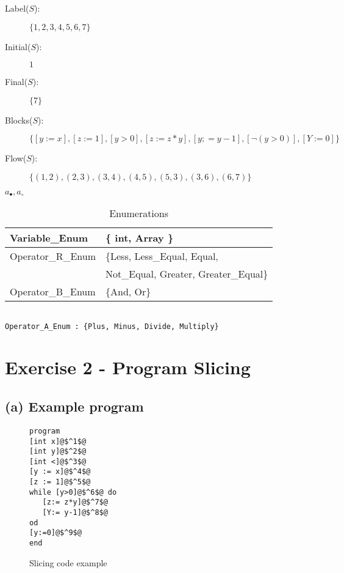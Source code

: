 \documentclass[12pt]{article}
\begin{document}

\begin{description}
\item[Label($S$):] $\{ 1,2,3,4,5,6,7 \}$
\item[Initial($S$):] $1$
\item[Final($S$):] $\{ 7 \}$
\item[Blocks($S$):]$\{ [y:=x], [z:=1], [y>0], [z:=z*y], [y;=y-1], [\lnot (y>0)] ,[Y:=0] \}$
\item[Flow($S$):] $\{ (1,2), (2,3), (3,4), (4,5), (5,3), (3,6), (6,7) \}$
\end{description}

$a_{\bullet}, a_{\circ}$

\begin{table}[h]
    \begin{tabular}{l | l }
    Variable\_Enum  &  \{ int, Array \} \\
    \hline
    Operator\_R\_Enum & \{Less, Less\_Equal, Equal, \\
                      &  Not\_Equal, Greater, Greater\_Equal\} \\
    \hline
    Operator\_B\_Enum & \{And, Or\} \\

    \end{tabular}
    \centering
	\caption{Enumerations}
	\label{table:rd_equations}
\end{table}


\begin{verbatim}

Operator_A_Enum : {Plus, Minus, Divide, Multiply}
\end{verbatim}


\section*{Exercise 2 - Program Slicing}

\subsection*{(a) Example program}
\begin{figure}
\begin{lstlisting}
program
[int x]@$^1$@
[int y]@$^2$@
[int <]@$^3$@
[y := x]@$^4$@
[z := 1]@$^5$@
while [y>0]@$^6$@ do
   [z:= z*y]@$^7$@
   [Y:= y-1]@$^8$@
od
[y:=0]@$^9$@
end
\end{lstlisting}
\label{source:example2}
\caption{Slicing code example}
\end{figure}
\end{document}
